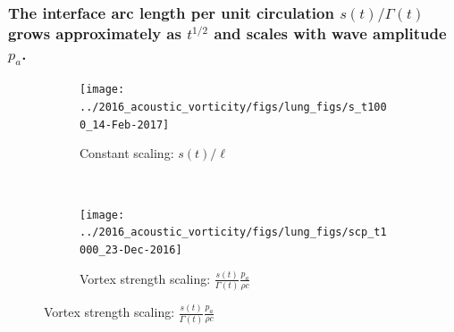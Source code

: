   \begin{frame}
    \frametitle{The interface arc length per unit circulation $s(t)/\Gamma(t)$ grows approximately as $t^{1/2}$ and scales with wave amplitude $p_a$.}
    \begin{figure}
      \centering
      \begin{subfigure}[t]{0.45\textwidth}
        \centering
        \texttt{[image: ../2016\_acoustic\_vorticity/figs/lung\_figs/s\_t1000\_14-Feb-2017]}
        \caption{\label{fig:trapz_interface_t1000} Constant scaling: $s(t)/\ell$}
      \end{subfigure}
      ~
      \begin{subfigure}[t]{0.45\textwidth}
        \centering
        \texttt{[image: ../2016\_acoustic\_vorticity/figs/lung\_figs/scp\_t1000\_23-Dec-2016]}
        \caption{Vortex strength scaling: $\frac{s(t)}{\Gamma(t)}\frac{p_a}{\rho c}$}
      \end{subfigure}
    \end{figure}
  \end{frame}
